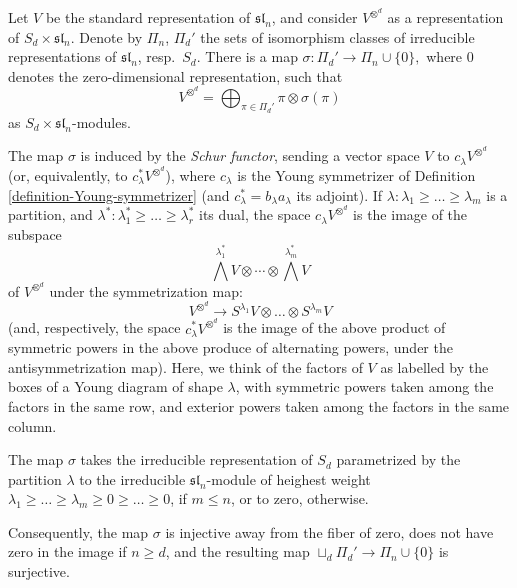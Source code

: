 \begin{theorem}
 \label{theorem-Schur-Weyl}
Let $V$ be the standard representation of $\mathfrak{sl}_n$, and consider $V^{\otimes^d}$ as a representation of $S_d\times \mathfrak{sl}_n$. Denote by $\Pi_n$, $\Pi_d'$ the sets of isomorphism classes of irreducible representations of $\mathfrak{sl}_n$, resp.\ $S_d$. There is a map $\sigma:\Pi_d'\to \Pi_n \cup \{0\},$
where $0$ denotes the zero-dimensional representation,
such that 
$$V^{\otimes^d} = \bigoplus_{\pi\in \Pi_d'} \pi \otimes \sigma(\pi)$$
as $S_d\times \mathfrak{sl}_n$-modules.  

The map $\sigma$ is induced by the \emph{Schur functor}, sending a vector space $V$ to $c_\lambda V^{\otimes^d}$ (or, equivalently, to $c_\lambda^* V^{\otimes^d}$), where $c_\lambda$ is the Young symmetrizer of Definition \ref{definition-Young-symmetrizer} (and $c_\lambda^*=b_\lambda a_\lambda$ its adjoint). If $\lambda:\lambda_1 \ge \dots \ge \lambda_m$ is a partition, and $\lambda^*: \lambda_1^* \ge \dots \ge \lambda_r^*$ its dual, the space $c_\lambda V^{\otimes^d}$ is the image of the subspace
$$ \bigwedge^{\lambda_1^*}V \otimes \cdots \otimes \bigwedge^{\lambda_m^*} V$$
of $V^{\otimes^d}$ under the symmetrization map:
$$ V^{\otimes^d} \to S^{\lambda_1} V \otimes \dots \otimes S^{\lambda_m} V$$
(and, respectively, the space $c_\lambda^* V^{\otimes^d}$ is the image of the above product of symmetric powers in the above produce of alternating powers, under the antisymmetrization map). Here, we think of the factors of $V$ as labelled by the boxes of a Young diagram of shape $\lambda$, with symmetric powers taken among the factors in the same row, and exterior powers taken among the factors in the same column.

The map $\sigma$ takes the irreducible representation of $S_d$ parametrized by the partition $\lambda$ to the irreducible $\mathfrak{sl}_n$-module of heighest weight $\lambda_1 \ge \dots \ge \lambda_m \ge 0\ge \dots \ge 0$, if $m \le n$, or to zero, otherwise. 

Consequently, the map $\sigma$ is injective away from the fiber of zero, does not have zero in the image if $n\ge d$, and the resulting map $\sqcup_d \Pi_d' \to \Pi_n \cup\{0\}$ is surjective.
\end{theorem}


